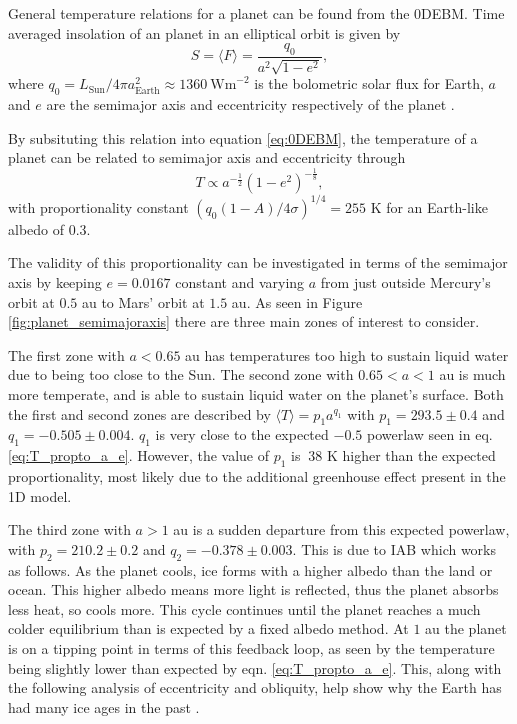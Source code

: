 \documentclass[12pt, onecolumn]{revtex4-2}    %
\begin{document}
General temperature relations for a planet can be found from the 0DEBM.
Time averaged insolation of an planet in an elliptical orbit is given by
\begin{equation}
  S = \langle F \rangle = \frac{q_0}{a^2 \sqrt{1-e^2}},
  \label{eq:avgInsolation}
\end{equation}
where $q_0 = L_{\text{Sun}}/4\pi a_{\text{Earth}}^2 \approx 1360 \ \text{Wm}^{-2}$ is the bolometric solar flux for Earth, $a$ and $e$ are the semimajor axis and eccentricity respectively of the planet \cite{Mendez2017}.

By subsituting this relation into equation \eqref{eq:0DEBM}, the temperature of a planet can be related to semimajor axis and eccentricity through
\begin{equation}
  T \propto a^{-\frac{1}{2}} (1-e^2)^{-\frac{1}{8}}, 
  \label{eq:T_propto_a_e}
\end{equation}
with proportionality constant $(q_0 (1-A) / 4\sigma)^{1/4} = 255$ K for an Earth-like albedo of 0.3.


The validity of this proportionality can be investigated in terms of the semimajor axis by keeping $e = 0.0167$ constant and varying $a$ from just outside Mercury's orbit at $0.5$ au to Mars' orbit at $1.5$ au.
As seen in Figure \ref{fig:planet_semimajoraxis} there are three main zones of interest to consider.

The first zone with $a < 0.65$ au has temperatures too high to sustain liquid water due to being too close to the Sun.
The second zone with $0.65 < a < 1$ au is much more temperate, and is able to sustain liquid water on the planet's surface.
Both the first and second zones are described by $\langle T \rangle = p_1 a^{q_1}$ with $p_1 = 293.5 \pm 0.4$ and $q_1= -0.505 \pm 0.004$. $q_1$ is very close to the expected $-0.5$ powerlaw seen in eq. \eqref{eq:T_propto_a_e}.
However, the value of $p_1$ is $~38$ K higher than the expected proportionality, most likely due to the additional greenhouse effect present in the 1D model.

The third zone with $a > 1$ au is a sudden departure from this expected powerlaw, with $p_2 = 210.2 \pm 0.2$ and $q_2 = -0.378 \pm 0.003$.
This is due to IAB which works as follows.
As the planet cools, ice forms with a higher albedo than the land or ocean.
This higher albedo means more light is reflected, thus the planet absorbs less heat, so cools more.
This cycle continues until the planet reaches a much colder equilibrium than is expected by a fixed albedo method.
At $1$ au the planet is on a tipping point in terms of this feedback loop, as seen by the temperature being slightly lower than expected by eqn. \eqref{eq:T_propto_a_e}.
This, along with the following analysis of eccentricity and obliquity, help show why the Earth has had many ice ages in the past \cite{Emiliani78}.
\end{document}
